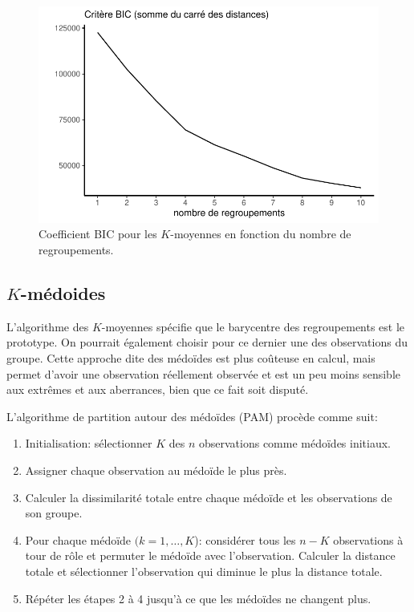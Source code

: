 \documentclass[
  11pt,
  letterpaper,
]{scrbook}
\providecommand{\tightlist}{%
  \setlength{\itemsep}{0pt}\setlength{\parskip}{0pt}}\usepackage{longtable,booktabs,array}
\theoremstyle{definition}
\theoremstyle{remark}
\begin{document}
\begin{figure}[ht!]

{\centering \includegraphics{regroupements_files/figure-pdf/fig-bickmoy-1.pdf}

}

\caption{\label{fig-bickmoy}Coefficient BIC pour les \(K\)-moyennes en
fonction du nombre de regroupements.}

\end{figure}

\hypertarget{k-muxe9doides}{%
\subsection{\texorpdfstring{\(K\)-médoides}{K-médoides}}\label{k-muxe9doides}}

L'algorithme des \(K\)-moyennes spécifie que le barycentre des
regroupements est le prototype. On pourrait également choisir pour ce
dernier une des observations du groupe. Cette approche dite des médoïdes
est plus coûteuse en calcul, mais permet d'avoir une observation
réellement observée et est un peu moins sensible aux extrêmes et aux
aberrances, bien que ce fait soit disputé.

L'algorithme de partition autour des médoïdes (PAM) procède comme suit:

\begin{enumerate}
\def\labelenumi{\arabic{enumi}.}
\tightlist
\item
  Initialisation: sélectionner \(K\) des \(n\) observations comme
  médoïdes initiaux.
\item
  Assigner chaque observation au médoïde le plus près.
\item
  Calculer la dissimilarité totale entre chaque médoïde et les
  observations de son groupe.
\item
  Pour chaque médoïde \((k=1, \ldots, K\)): considérer tous les \(n-K\)
  observations à tour de rôle et permuter le médoïde avec l'observation.
  Calculer la distance totale et sélectionner l'observation qui diminue
  le plus la distance totale.
\item
  Répéter les étapes 2 à 4 jusqu'à ce que les médoïdes ne changent plus.
\end{enumerate}
\end{document}
